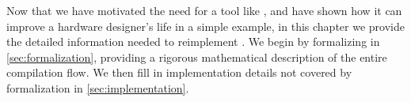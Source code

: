 
Now that we have motivated
  the need for a tool like \lr,
  and have shown how it can improve
  a hardware designer's life in a simple example,
  in this chapter
  we provide the detailed information needed
  to reimplement \lr.
We begin by formalizing \lr
  in \cref{sec:formalization},
  providing a rigorous mathematical description
  of the entire compilation flow.
We then fill in implementation details
  not covered by formalization
  in \cref{sec:implementation}.